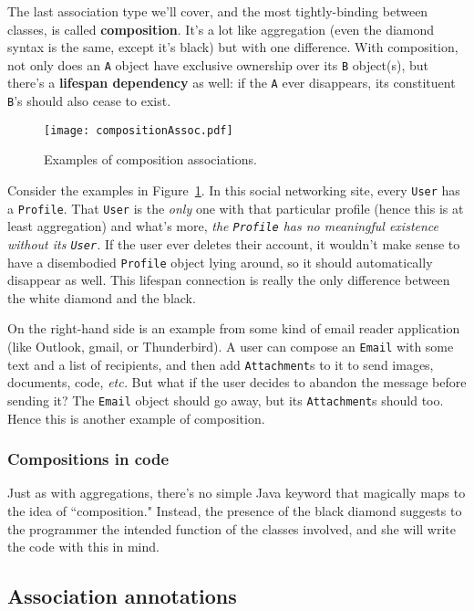 The last association type we'll cover, and the most tightly-binding between
classes, is called \textbf{composition}. It's a lot like aggregation (even the
diamond syntax is the same, except it's black) but with one difference. With
composition, not only does an \texttt{A} object have exclusive ownership over
its \texttt{B} object(s), but there's a \textbf{lifespan dependency} as well:
if the \texttt{A} ever disappears, its constituent \texttt{B}'s should also
cease to exist.

\begin{figure}[ht]
\centering
\texttt{[image: compositionAssoc.pdf]}   %
\caption{Examples of composition associations.}
\label{fig:compositionAssoc}
\end{figure}


Consider the examples in Figure~\ref{fig:compositionAssoc}. In this social
networking site, every \texttt{User} has a \texttt{Profile}. That
\texttt{User} is the \textit{only} one with that particular profile (hence
this is at least aggregation) and what's more, \textit{the \texttt{Profile}
has no meaningful existence without its \texttt{User}.} If the user ever
deletes their account, it wouldn't make sense to have a disembodied
\texttt{Profile} object lying around, so it should automatically disappear as
well. This lifespan connection is really the only difference between the white
diamond and the black.

On the right-hand side is an example from some kind of email reader
application (like Outlook, gmail, or Thunderbird). A user can compose an
\texttt{Email} with some text and a list of recipients, and then add
\texttt{Attachment}s to it to send images, documents, code, \textit{etc.} But
what if the user decides to abandon the message before sending it? The
\texttt{Email} object should go away, but its \texttt{Attachment}s should too.
Hence this is another example of composition.

\subsubsection{Compositions in code}

Just as with aggregations, there's no simple Java keyword that magically maps
to the idea of ``composition." Instead, the presence of the black diamond
suggests to the programmer the intended function of the classes involved, and
she will write the code with this in mind.


\subsection{Association annotations}

